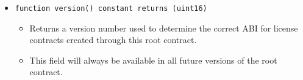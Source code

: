 \documentclass[a4paper]{article}
\begin{document}
\begin{itemize}
  \item \texttt{function version() constant returns (uint16)}
  \begin{itemize}
    \item Returns a version number used to determine the correct ABI for license contracts created through this root contract.
    \item This field will always be available in all future versions of the root contract.
  \end{itemize}
\end{itemize}
\end{document}
